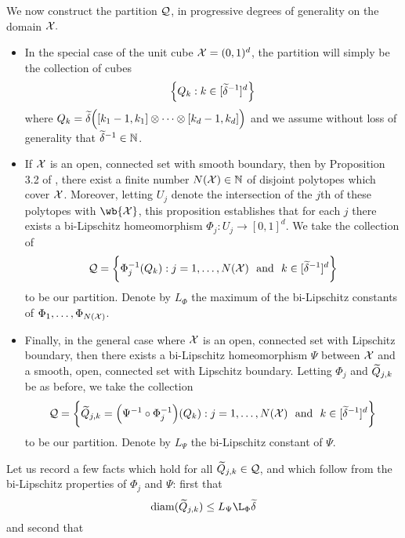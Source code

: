 We now construct the partition $\mathcal{Q}$, in progressive degrees of generality on the domain $\mathcal{X}.$
\begin{itemize}
	\item In the special case of the unit cube $\mathcal{X} = (0,1)^d$, the partition will simply be the collection of cubes
	\begin{equation*}
	\left\{Q_k: k \in [\widetilde{\delta}^{-1}]^d\right\} 
	\end{equation*}
	where $Q_k = \widetilde{\delta}\Bigl([k_1 - 1,k_1] \otimes \cdots \otimes [k_d - 1,k_d]\Bigr)$ and we assume without loss of generality that $\widetilde{\delta}^{-1} \in \mathbb{N}$.
	\item If $\mathcal{\mathcal{X}}$ is an open, connected set with smooth boundary, then by Proposition 3.2 of \citet{trillos2015}, there exist a finite number $N(\mathcal{X}) \in \mathbb{N}$ of disjoint polytopes which cover $\mathcal{X}$. Moreover, letting $U_j$ denote the intersection of the $j$th of these polytopes with $\wb{\Xset}$, this proposition establishes that for each $j$ there exists a bi-Lipschitz homeomorphism $\Phi_j: U_j \to [0,1]^d$. We take the collection of
	\begin{equation*}
	\mathcal{Q} = \biggl\{\Phi_j^{-1}(Q_k): j = 1,\ldots,N(\mathcal{X})~~\textrm{and}~~k \in [\widetilde{\delta}^{-1}]^d\biggr\}
	\end{equation*}
	to be our partition. Denote by $L_{\Phi}$ the maximum of the bi-Lipschitz constants of $\Phi_1,\ldots,\Phi_{N(\mathcal{X})}$.
	\item Finally, in the general case where $\mathcal{X}$ is an open, connected set with Lipschitz boundary, then there exists a bi-Lipschitz homeomorphism $\Psi$ between $\mathcal{X}$ and a smooth, open, connected set with Lipschitz boundary. Letting $\Phi_j$ and $\widetilde{Q}_{j,k}$ be as before, we take the collection
	\begin{equation*}
	\mathcal{Q} = \biggl\{\widetilde{Q}_{j,k} = \Bigl(\Psi^{-1} \circ \Phi_j^{-1}\Bigr)(Q_k): j = 1,\ldots,N(\mathcal{X})~~\textrm{and}~~k \in [\widetilde{\delta}^{-1}]^d\biggr\}
	\end{equation*}
	to be our partition. Denote by $L_{\Psi}$ the bi-Lipschitz constant of $\Psi$.
\end{itemize}
Let us record a few facts which hold for all $\widetilde{Q}_{j,k} \in \mathcal{Q}$, and which follow from the bi-Lipschitz properties of $\Phi_j$ and $\Psi$: first that
\begin{equation}
\label{pf:prop_optimal_transport_1}
\diam(\wt{Q}_{j,k}) \leq L_{\Psi} \L_{\Phi} \wt{\delta}
\end{equation}
and second that
